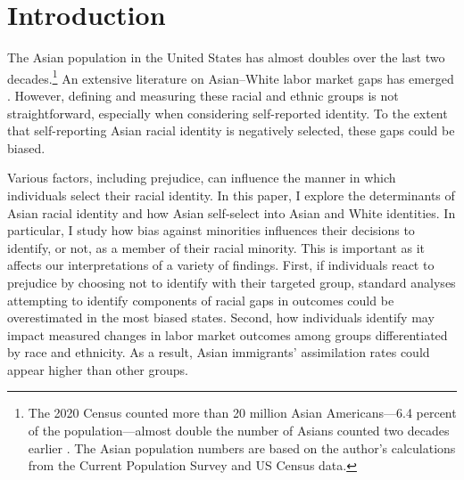 
\section{Introduction}\label{sec:intro}

The Asian population in the United States has almost doubles over the last two decades.\footnote{The 2020 Census counted more than 20 million Asian Americans---6.4 percent of the population---almost double the number of Asians counted two decades earlier \autocite{floodsarahIntegratedPublicUse2021a}. The Asian population numbers are based on the author's calculations from the Current Population Survey and US Census data.} An extensive literature on Asian--White labor market gaps has emerged \autocite{chiswick1983analysis, duleep2012economic, hilger2016upward, arabsheibani2010asian}. However, defining and measuring these racial and ethnic groups is not straightforward, especially when considering self-reported identity. To the extent that self-reporting Asian racial identity is negatively selected, these gaps could be biased.

Various factors, including prejudice, can influence the manner in which individuals select their racial identity. In this paper, I explore the determinants of Asian racial identity and how Asian self-select into Asian and White identities. In particular, I study how bias against minorities influences their decisions to identify, or not, as a member of their racial minority. This is important as it affects our interpretations of a variety of findings. First, if individuals react to prejudice by choosing not to identify with their targeted group, standard analyses attempting to identify components of racial gaps in outcomes could be overestimated in the most biased states. Second, how individuals identify may impact measured changes in labor market outcomes among groups differentiated by race and ethnicity. As a result, Asian immigrants' assimilation rates could appear higher than other groups. 

